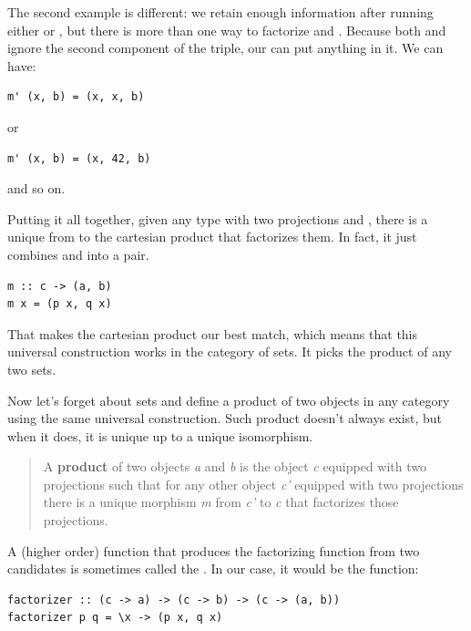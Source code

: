 The second example is different: we retain enough information after
running either  or , but there is more than one way
to factorize  and . Because both  and
 ignore the second component of the triple, our 
can put anything in it. We can have:

\begin{verbatim}
m' (x, b) = (x, x, b)
\end{verbatim}

\noindent
or

\begin{verbatim}
m' (x, b) = (x, 42, b)
\end{verbatim}

\noindent
and so on.

Putting it all together, given any type  with two projections
 and , there is a unique  from 
to the cartesian product  that factorizes them. In fact,
it just combines  and  into a pair.

\begin{verbatim}
m :: c -> (a, b)
m x = (p x, q x)
\end{verbatim}

That makes the cartesian product  our best match, which
means that this universal construction works in the category of sets. It
picks the product of any two sets.

Now let's forget about sets and define a product of two objects in any
category using the same universal construction. Such product doesn't
always exist, but when it does, it is unique up to a unique isomorphism.

\begin{quote}
A \textbf{product} of two objects \emph{a} and \emph{b} is the object
\emph{c} equipped with two projections such that for any other object
\emph{c'} equipped with two projections there is a unique morphism
\emph{m} from \emph{c'} to \emph{c} that factorizes those projections.
\end{quote}

A (higher order) function that produces the factorizing function
 from two candidates is sometimes called the
. In our case, it would be the function:

\begin{verbatim}
factorizer :: (c -> a) -> (c -> b) -> (c -> (a, b))
factorizer p q = \x -> (p x, q x)
\end{verbatim}


